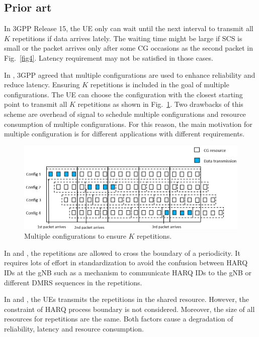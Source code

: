 \documentclass{ieeeaccess}
\begin{document}
\subsection{Prior art}\label{IIIBN}
In 3GPP Release 15, the UE only can wait until the next interval to transmit all $K$ repetitions if data arrives lately. The waiting time might be large if SCS is small or the packet arrives only after some CG occasions as the second packet in Fig.~\ref{fig4}. Latency requirement may not be satisfied in those cases.

In \cite{ref7}, 3GPP agreed that multiple configurations are used to enhance reliability and reduce latency. Ensuring $K$ repetitions is included in the goal of multiple configurations. The UE can choose the configuration with the closest starting point to transmit all $K$ repetitions as shown in Fig.~\ref{fig14}. Two drawbacks of this scheme are overhead of signal to schedule multiple configurations and resource consumption of multiple configurations. For this reason, the main motivation for multiple configuration is for different applications with different requirements.

\begin{figure}[htbp]
\centerline{\includegraphics[scale=0.32]{fig14.PNG}}
\caption{Multiple configurations to ensure $K$ repetitions.}
\label{fig14}
\vspace{-4mm}
\end{figure}


In \cite{ref8} and \cite{ref9}, the repetitions are allowed to cross the boundary of a periodicity. It requires lots of effort in standardization to avoid the confusion between HARQ IDs at the gNB such as a mechanism to communicate HARQ IDs to the gNB or different DMRS sequences in the repetitions.

In \cite{ref10} and \cite{ref11}, the UEs transmits the repetitions in the shared resource. However, the constraint of HARQ process boundary is not considered. Moreover, the size of all resources for repetitions are the same. Both factors cause a degradation of reliability, latency and resource consumption.
\end{document}

